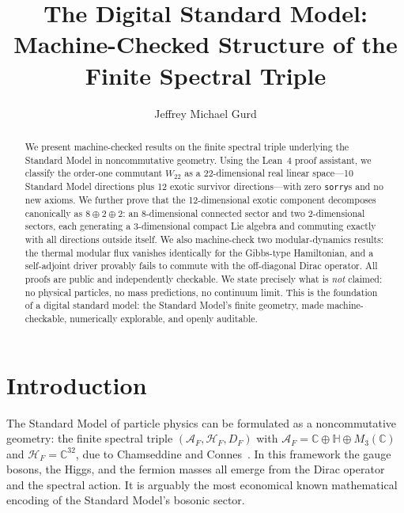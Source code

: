 \documentclass[aps,prd,twocolumn,superscriptaddress,showpacs]{revtex4-2}
\begin{document}
\title{The Digital Standard Model:\\
Machine-Checked Structure of the Finite Spectral Triple}

\author{Jeffrey Michael Gurd}

\begin{abstract}
We present machine-checked results on the finite spectral triple underlying
the Standard Model in noncommutative geometry. Using the Lean~4 proof
assistant, we classify the order-one commutant $W_{22}$ as a
22-dimensional real linear space---10 Standard Model directions plus 12
exotic survivor directions---with zero \texttt{sorry}s and no new axioms.
We further prove that the 12-dimensional exotic component decomposes
canonically as $8 \oplus 2 \oplus 2$: an 8-dimensional connected sector
and two 2-dimensional sectors, each generating a 3-dimensional compact
Lie algebra and commuting exactly with all directions outside itself.
We also machine-check two modular-dynamics results: the thermal modular
flux vanishes identically for the Gibbs-type Hamiltonian, and a
self-adjoint driver provably fails to commute with the off-diagonal
Dirac operator. All proofs are public and independently checkable. We
state precisely what is \emph{not} claimed: no physical particles, no
mass predictions, no continuum limit. This is the foundation of a
digital standard model: the Standard Model's finite geometry, made
machine-checkable, numerically explorable, and openly auditable.
\end{abstract}

\maketitle

\section{Introduction}

The Standard Model of particle physics can be formulated as a
noncommutative geometry: the finite spectral triple
$(\mathcal{A}_F, \mathcal{H}_F, D_F)$ with
$\mathcal{A}_F = \mathbb{C} \oplus \mathbb{H} \oplus M_3(\mathbb{C})$
and $\mathcal{H}_F = \mathbb{C}^{32}$, due to Chamseddine and
Connes~\cite{CC2007,CCM2007}. In this framework the gauge bosons,
the Higgs, and the fermion masses all emerge from the Dirac operator
and the spectral action. It is arguably the most economical known
mathematical encoding of the Standard Model's bosonic sector.
\end{document}
